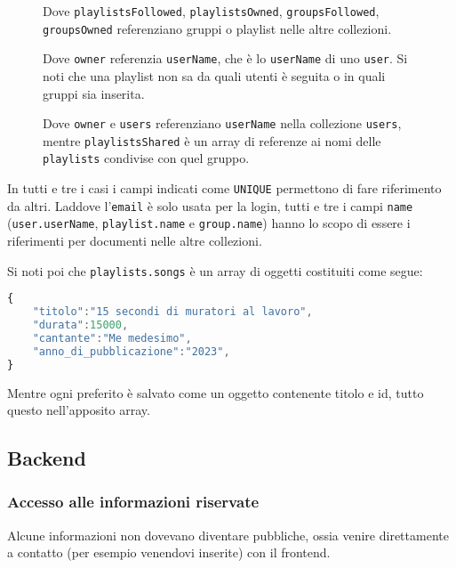 \begin{figure}[h]
    \begin{minipage}{.30\textwidth}
        Dove \verb|playlistsFollowed|, \verb|playlistsOwned|, \verb|groupsFollowed|, \verb|groupsOwned| referenziano gruppi o playlist nelle altre collezioni.
    \end{minipage}
    \hfill
    \begin{minipage}{.30\textwidth}
        Dove \verb|owner| referenzia \verb|userName|, che è lo \verb|userName| di uno \verb|user|. Si noti che una playlist non sa da quali utenti è seguita o in quali gruppi sia inserita.
    \end{minipage}
    \hfill
    \begin{minipage}{.30\textwidth}
        Dove \verb|owner| e \verb|users| referenziano \verb|userName| nella collezione \verb|users|, mentre \verb|playlistsShared| è un array di referenze ai nomi delle \verb|playlists| condivise con quel gruppo.
    \end{minipage}
\end{figure}
In tutti e tre i casi i campi indicati come \verb|UNIQUE| permettono di fare riferimento da altri. Laddove l'\verb|email| è solo usata per la login, tutti e tre i campi \verb|name| (\verb|user.userName|, \verb|playlist.name| e \verb|group.name|) hanno lo scopo di essere i riferimenti per documenti nelle altre collezioni.

Si noti poi che \verb|playlists.songs| è un array di oggetti costituiti come segue:
\begin{lstlisting}[language=JavaScript]
{
    "titolo":"15 secondi di muratori al lavoro",
    "durata":15000,
    "cantante":"Me medesimo",
    "anno_di_pubblicazione":"2023",
}
\end{lstlisting}
Mentre ogni preferito è salvato come un oggetto contenente titolo e id, tutto questo nell'apposito array.
\subsection{Backend}
\subsubsection{Accesso alle informazioni riservate}
Alcune informazioni non dovevano diventare pubbliche, ossia venire direttamente a contatto (per esempio venendovi inserite) con il frontend.

